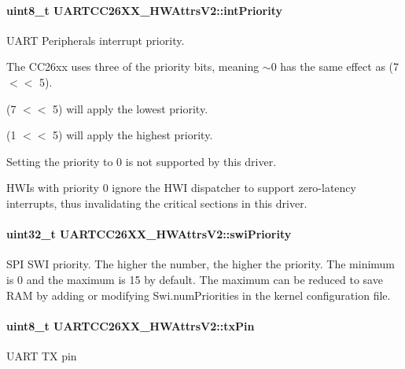 \paragraph[{int\+Priority}]{\setlength{\rightskip}{0pt plus 5cm}uint8\+\_\+t U\+A\+R\+T\+C\+C26\+X\+X\+\_\+\+H\+W\+Attrs\+V2\+::int\+Priority}\label{struct_u_a_r_t_c_c26_x_x___h_w_attrs_v2_a154b4300357fcc365090a970b17aa67a}


U\+A\+R\+T Peripheral\textquotesingle{}s interrupt priority. 

The C\+C26xx uses three of the priority bits, meaning $\sim$0 has the same effect as (7 $<$$<$ 5).

(7 $<$$<$ 5) will apply the lowest priority.

(1 $<$$<$ 5) will apply the highest priority.

Setting the priority to 0 is not supported by this driver.

H\+W\+I\textquotesingle{}s with priority 0 ignore the H\+W\+I dispatcher to support zero-\/latency interrupts, thus invalidating the critical sections in this driver. 
\paragraph[{swi\+Priority}]{\setlength{\rightskip}{0pt plus 5cm}uint32\+\_\+t U\+A\+R\+T\+C\+C26\+X\+X\+\_\+\+H\+W\+Attrs\+V2\+::swi\+Priority}\label{struct_u_a_r_t_c_c26_x_x___h_w_attrs_v2_a6a8b6d625ad061be7e354ce1db08e86e}


S\+P\+I S\+W\+I priority. The higher the number, the higher the priority. The minimum is 0 and the maximum is 15 by default. The maximum can be reduced to save R\+A\+M by adding or modifying Swi.\+num\+Priorities in the kernel configuration file. 

\paragraph[{tx\+Pin}]{\setlength{\rightskip}{0pt plus 5cm}uint8\+\_\+t U\+A\+R\+T\+C\+C26\+X\+X\+\_\+\+H\+W\+Attrs\+V2\+::tx\+Pin}\label{struct_u_a_r_t_c_c26_x_x___h_w_attrs_v2_a44ce413fed4b61b66f5155a4b90c2769}
U\+A\+R\+T T\+X pin 
